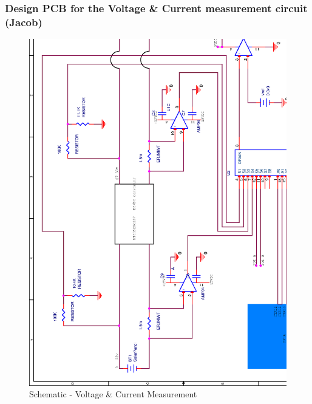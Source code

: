 \subsubsection{Design PCB for the Voltage \& Current measurement circuit (Jacob)}


\begin{figure}[h!]
\hspace*{-3cm}
\centering
\includegraphics[width=13cm]{./img/SCHEMATIC1_VC_measurement}
\caption{Schematic - Voltage \& Current Measurement}
\label{fig:SCHEMATIC1_VC_measurement}
\end{figure}




